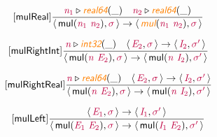 \documentclass[10pt,leqno,fleqn]{article}
\newcommand{\artVariable}[1]{\mbox{\color{purple}\em #1\/}}
\newcommand{\artConstructor}[1]{\mbox{\sf #1}}
\newcommand{\artSpecial}[1]{\mbox{\color{orange}\sf\em #1}}
\begin{document}
\begin{equation}
\tag*{[\artConstructor{\sf mulReal}]}
\begin{split}\frac{ \artVariable{n$_{1}$}\triangleright \artSpecial{real64}(\_) \quad  \artVariable{n$_{2}$}\triangleright \artSpecial{real64}(\_) }{\langle\, \artConstructor{\sf mul}(\artVariable{n$_{1}$}\ \artVariable{n$_{2}$}), \artVariable{$\sigma$}\,\rangle \rightarrow \langle\, \artSpecial{mul}(\artVariable{n$_{1}$}\ \artVariable{n$_{2}$}), \artVariable{$\sigma$}\,\rangle }
\end{split}
\end{equation}

\begin{equation}
\tag*{[\artConstructor{\sf mulRightInt}]}
\begin{split}\frac{ \artVariable{n}\triangleright \artSpecial{int32}(\_) \quad \langle\, \artVariable{E$_{2}$}, \artVariable{$\sigma$}\,\rangle \rightarrow \langle\, \artVariable{I$_{2}$}, \artVariable{$\sigma$\/$^\prime$}\,\rangle }{\langle\, \artConstructor{\sf mul}(\artVariable{n}\ \artVariable{E$_{2}$}), \artVariable{$\sigma$}\,\rangle \rightarrow \langle\, \artConstructor{\sf mul}(\artVariable{n}\ \artVariable{I$_{2}$}), \artVariable{$\sigma$\/$^\prime$}\,\rangle }
\end{split}
\end{equation}

\begin{equation}
\tag*{[\artConstructor{\sf mulRightReal}]}
\begin{split}\frac{ \artVariable{n}\triangleright \artSpecial{real64}(\_) \quad \langle\, \artVariable{E$_{2}$}, \artVariable{$\sigma$}\,\rangle \rightarrow \langle\, \artVariable{I$_{2}$}, \artVariable{$\sigma$\/$^\prime$}\,\rangle }{\langle\, \artConstructor{\sf mul}(\artVariable{n}\ \artVariable{E$_{2}$}), \artVariable{$\sigma$}\,\rangle \rightarrow \langle\, \artConstructor{\sf mul}(\artVariable{n}\ \artVariable{I$_{2}$}), \artVariable{$\sigma$\/$^\prime$}\,\rangle }
\end{split}
\end{equation}

\begin{equation}
\tag*{[\artConstructor{\sf mulLeft}]}
\begin{split}\frac{\langle\, \artVariable{E$_{1}$}, \artVariable{$\sigma$}\,\rangle \rightarrow \langle\, \artVariable{I$_{1}$}, \artVariable{$\sigma$\/$^\prime$}\,\rangle }{\langle\, \artConstructor{\sf mul}(\artVariable{E$_{1}$}\ \artVariable{E$_{2}$}), \artVariable{$\sigma$}\,\rangle \rightarrow \langle\, \artConstructor{\sf mul}(\artVariable{I$_{1}$}\ \artVariable{E$_{2}$}), \artVariable{$\sigma$\/$^\prime$}\,\rangle }
\end{split}
\end{equation}
\end{document}
